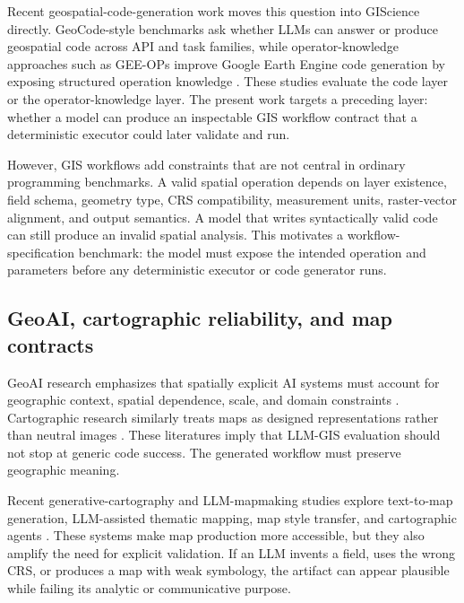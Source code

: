 \documentclass[12pt]{gsis}  %
\begin{document}
Recent geospatial-code-generation work moves this question into GIScience directly. GeoCode-style benchmarks ask whether LLMs can answer or produce geospatial code across API and task families, while operator-knowledge approaches such as GEE-OPs improve Google Earth Engine code generation by exposing structured operation knowledge \citep{Hou_2025_GeoCode,Hou_2025_GEEOPs}. These studies evaluate the code layer or the operator-knowledge layer. The present work targets a preceding layer: whether a model can produce an inspectable GIS workflow contract that a deterministic executor could later validate and run.

However, GIS workflows add constraints that are not central in ordinary programming benchmarks. A valid spatial operation depends on layer existence, field schema, geometry type, CRS compatibility, measurement units, raster-vector alignment, and output semantics. A model that writes syntactically valid code can still produce an invalid spatial analysis. This motivates a workflow-specification benchmark: the model must expose the intended operation and parameters before any deterministic executor or code generator runs.

\subsection{GeoAI, cartographic reliability, and map contracts}

GeoAI research emphasizes that spatially explicit AI systems must account for geographic context, spatial dependence, scale, and domain constraints \citep{Janowicz_2019,Zhu_2017,Ma_2019,Kang_2024}. Cartographic research similarly treats maps as designed representations rather than neutral images \citep{Harley_1989,Roth_2013,Roth_2015}. These literatures imply that LLM-GIS evaluation should not stop at generic code success. The generated workflow must preserve geographic meaning.

Recent generative-cartography and LLM-mapmaking studies explore text-to-map generation, LLM-assisted thematic mapping, map style transfer, and cartographic agents \citep{Zhang_2024_MapGPT,Yang_2025_MapColorAI,Zhang_2025_MapGenerator,PannoonNetek_2025_Choropleth,Wang_2025_CartoAgent}. These systems make map production more accessible, but they also amplify the need for explicit validation. If an LLM invents a field, uses the wrong CRS, or produces a map with weak symbology, the artifact can appear plausible while failing its analytic or communicative purpose.
\end{document}
